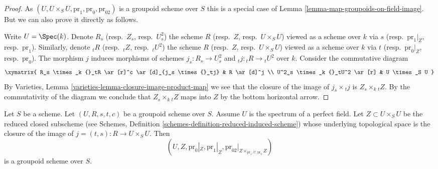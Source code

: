 \begin{proof}
As $(U, U \times_S U, \text{pr}_1, \text{pr}_0, \text{pr}_{02})$
is a groupoid scheme over $S$ this is a special case of
Lemma \ref{lemma-map-groupoids-on-field-image}.
But we can also prove it directly as follows.

\medskip\noindent
Write $U = \Spec(k)$. Denote
$R_s$ (resp.\ $Z_s$, resp.\ $U^2_s$) the scheme
$R$ (resp.\ $Z$, resp.\ $U \times_S U$) viewed as a scheme over $k$ via
$s$ (resp.\ $\text{pr}_1|_Z$, resp.\ $\text{pr}_1$).
Similarly, denote
${}_tR$ (resp.\ ${}_tZ$, resp.\ ${}_tU^2$) the scheme
$R$ (resp.\ $Z$, resp.\ $U \times_S U$) viewed as a scheme over $k$ via
$t$ (resp.\ $\text{pr}_0|_Z$, resp.\ $\text{pr}_0$).
The morphism $j$ induces morphisms of schemes
$j_s : R_s \to U^2_s$ and ${}_tj : {}_tR \to {}_tU^2$ over $k$.
Consider the commutative diagram
$$
\xymatrix{
R_s \times_k {}_tR \ar[r]^c \ar[d]_{j_s \times {}_tj} &  R \ar[d]^j \\
U^2_s \times_k {}_tU^2 \ar[r] & U \times_S U
}
$$
By
Varieties, Lemma \ref{varieties-lemma-closure-image-product-map}
we see that the closure of the image of $j_s \times {}_tj$ is
$Z_s \times_k {}_tZ$. By the commutativity of the diagram we
conclude that $Z_s \times_k {}_tZ$ maps into $Z$ by the bottom
horizontal arrow.
\end{proof}

\begin{lemma}
\label{lemma-groupoid-on-perfect-field-image}
Let $S$ be a scheme. Let $(U, R, s, t, c)$ be a groupoid scheme
over $S$. Assume $U$ is the spectrum of a perfect field.
Let $Z \subset U \times_S U$ be the reduced closed subscheme (see
Schemes, Definition \ref{schemes-definition-reduced-induced-scheme})
whose underlying topological space is the closure of the image of
$j = (t, s) : R \to U \times_S U$.
Then
$$
(U, Z, \text{pr}_0|_Z, \text{pr}_1|_Z,
\text{pr}_{02}|_{Z \times_{\text{pr}_1, U, \text{pr}_0} Z})
$$
is a groupoid scheme over $S$.
\end{lemma}

